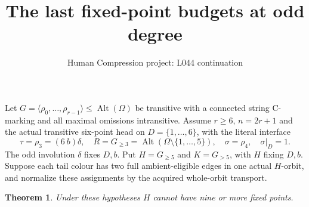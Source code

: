 \documentclass[11pt,a4paper]{article}
\title{The last fixed-point budgets at odd degree}
\author{Human Compression project: L044 continuation}
\date{}
\newtheorem{theorem}{Theorem}
\newcommand{\gen}[1]{\langle#1\rangle}
\newcommand{\Alt}{\operatorname{Alt}}
\begin{document}
\maketitle
Let $G=\gen{\rho_0,\ldots,\rho_{r-1}}\le\Alt(\Omega)$
be transitive with a connected string C-marking and all
maximal omissions intransitive. Assume $r\ge6$, $n=2r+1$
and the actual transitive six-point head on $D=\{1,\ldots,6\}$,
with the literal interface
\[
 \tau=\rho_3=(6\ b)\delta,\quad
 R=G_{\ge3}=\Alt(\Omega\setminus\{1,\ldots,5\}),\quad
 \sigma=\rho_4,\quad \sigma|_D=1.
\]
The odd involution $\delta$ fixes $D,b$. Put $H=G_{\ge5}$
and $K=G_{>5}$, with $H$ fixing $D,b$. Suppose each tail
colour has two full ambient-eligible edges in one actual
$H$-orbit, and normalize these assignments by the acquired
whole-orbit transport.

\begin{theorem}
Under these hypotheses $H$ cannot have nine or more fixed points.
\end{theorem}
\end{document}
